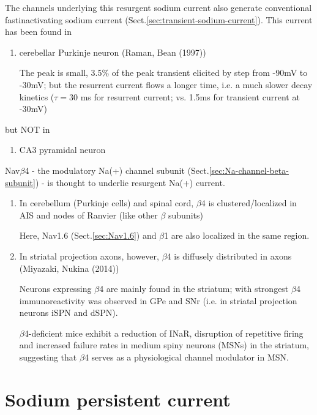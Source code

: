 The channels underlying this resurgent sodium current also generate conventional
fastinactivating sodium current (Sect.\ref{sec:transient-sodium-current}).
This current has been found in 
\begin{enumerate}
  \item cerebellar Purkinje neuron (Raman, Bean (1997))

The peak is small, 3.5\% of the peak transient elicited by step from -90mV to
-30mV; but the resurrent current flows a longer time, i.e. a much slower decay
kinetics ($\tau = 30$ ms for resurrent current; vs. 1.5ms for transient current
at -30mV)
   
\end{enumerate}
but NOT in
\begin{enumerate}
  \item CA3 pyramidal neuron
\end{enumerate}

Nav$\beta$4 - the modulatory Na(+) channel subunit
(Sect.\ref{sec:Na-channel-beta-subunit}) - is thought to underlie resurgent
Na(+) current.
\begin{enumerate}
  \item  In cerebellum (Purkinje cells) and spinal cord, $\beta$4 is
  clustered/localized in AIS and nodes of Ranvier (like other $\beta$ subunits)

Here, Nav1.6 (Sect.\ref{sec:Nav1.6}) and $\beta$1 are also localized in the same
region.

  \item In striatal projection axons, however, $\beta$4 is diffusely distributed
  in axons  (Miyazaki, Nukina (2014))
 
 Neurons expressing $\beta$4 are mainly found in the striatum; with strongest
 $\beta$4 immunoreactivity was observed in GPe and SNr (i.e. in striatal
 projection neurons iSPN and dSPN).
 
 $\beta$4-deficient mice exhibit a reduction of INaR, disruption of
  repetitive firing and increased failure rates in medium spiny neurons (MSNs)
  in the striatum, suggesting that $\beta$4 serves as a physiological channel
  modulator in MSN.


\end{enumerate}

\section{Sodium persistent current}
\label{sec:persistent-sodium-current}

